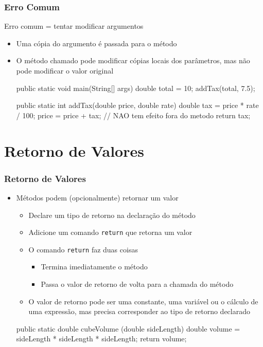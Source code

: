 \documentclass[xcolor={dvipsnames,table},aspectratio=169]{beamer}
\begin{document}
\begin{frame}[fragile]\frametitle{Erro Comum}
Erro comum = tentar modificar argumentos
\begin{itemize}
	\item Uma cópia do argumento é passada para o método
	\item O método chamado pode modificar cópias locais dos parâmetros, mas não pode modificar o valor original
{\small
\begin{javacode}
public static void main(String[] args) {
  double total = 10;
  addTax(total, 7.5); 
}

public static int addTax(double price, double rate) {
  double tax = price * rate / 100;
  price = price + tax; // NAO tem efeito fora do metodo
  return tax;
}
\end{javacode}
}
\end{itemize}
\end{frame}

\section{Retorno de Valores}

\begin{frame}[fragile]\frametitle{Retorno de Valores}
\begin{itemize}
	\item Métodos podem (opcionalmente) retornar um valor
	\begin{itemize}
		\item Declare um tipo de retorno na declaração do método
		\item Adicione um comando \texttt{return} que retorna um valor
		\item O comando \texttt{return} faz duas coisas
		\begin{itemize}
			\item Termina imediatamente o método
			\item Passa o valor de retorno de volta para a chamada do método
		\end{itemize}
		\item O valor de retorno pode ser uma constante, uma variável ou o cálculo de uma expressão, mas precisa corresponder ao tipo de retorno declarado
	\end{itemize}
\begin{javacode}
public static double cubeVolume (double sideLength) {
  double volume = sideLength * sideLength * sideLength;
  return volume;
}
\end{javacode}
\end{itemize}
\end{frame}
\end{document}
